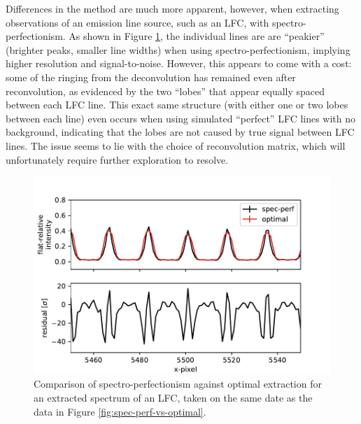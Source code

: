 Differences in the method are much more apparent, however, when extracting observations of an emission line source, such as an LFC, with spectro-perfectionism. As shown in Figure \ref{fig:spec-perf-vs-optimal-lfc}, the individual lines are are ``peakier'' (brighter peaks, smaller line widths) when using spectro-perfectionism, implying higher resolution and signal-to-noise. However, this appears to come with a cost: some of the ringing from the deconvolution has remained even after reconvolution, as evidenced by the two ``lobes'' that appear equally spaced between each LFC line. This exact same structure (with either one or two lobes between each line) even occurs when using simulated ``perfect'' LFC lines with no background, indicating that the lobes are not caused by true signal between LFC lines. The issue seems to lie with the choice of reconvolution matrix, which will unfortunately require further exploration to resolve.

\begin{figure}
    \centering
    \includegraphics{figures-5/spec-perf-vs-optimal-lfc.pdf}
    \caption{Comparison of spectro-perfectionism against optimal extraction for an extracted spectrum of an LFC, taken on the same date as the data in Figure \ref{fig:spec-perf-vs-optimal}.}
    \label{fig:spec-perf-vs-optimal-lfc}
\end{figure}

